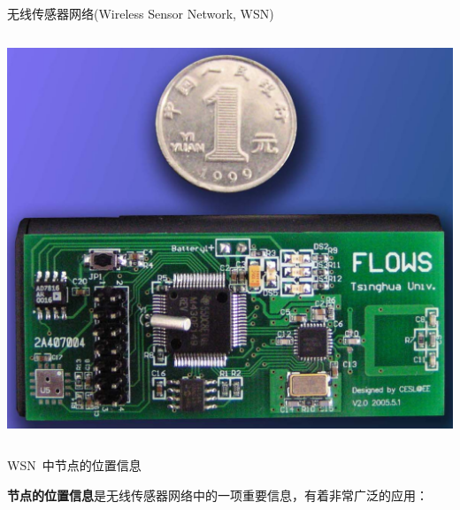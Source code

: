 \documentclass[mathserif,compress,CJKutf8, red]{beamer}
\begin{document}
\begin{CJK*}{UTF8}{song}
\begin{frame}{无线传感器网络(Wireless Sensor Network, WSN)}
\begin{columns}
\begin{column}{0.3\textwidth}
   \includegraphics[width=\textwidth]{images/flows3.jpg}
  \end{column}
\end{columns}
\end{frame}

\begin{frame}{WSN~中节点的位置信息}

\textbf{节点的位置信息}是无线传感器网络中的一项重要信息，有着非常广泛的应用：


\end{frame}
\end{CJK*}
\end{document}

